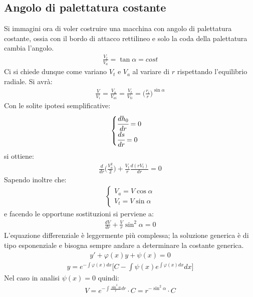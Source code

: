 \subsection{Angolo di palettatura costante}
Si immagini ora di voler costruire una macchina con angolo di palettatura costante, ossia con il bordo di attacco rettilineo e solo la coda della palettatura cambia l'angolo.
\begin{align*}
\frac{V_t}{V_a} = \tan \alpha = cost
\end{align*}
Ci si chiede dunque come variano $V_t$ e $V_a$ al variare di $r$ rispettando l'equilibrio radiale.
Si avrà:
\begin{align*}
\frac{V}{V_i} = \frac{V_a}{V_{ai}} = \frac{V_t}{V_{ti}} = \bigg(\frac{r_i}{r} \bigg)^{\sin \alpha}
\end{align*}
Con le solite ipotesi semplificative:
\begin{align*}
\begin{cases}
\cfrac{dh_0}{dr} = 0\\
\cfrac{ds}{dr} = 0 
\end{cases}
\end{align*}
si ottiene:
\begin{align*}
\frac{d}{dr} \bigg(\frac{V_a^2}{2} \bigg) + \frac{V_t}{r} \frac{d(rV_t)}{dr} = 0
\end{align*}
Sapendo inoltre che:
\begin{align*}
\begin{cases}
V_a = V \cos \alpha\\
V_t = V \sin \alpha
\end{cases}
\end{align*}
e facendo le opportune sostituzioni si perviene a:
\begin{align*}
\frac{dV}{dr} + \frac{V}{r} \sin^2 \alpha = 0
\end{align*}
L'equazione differenziale è leggermente più complessa; la soluzione generica è di tipo esponenziale e bisogna sempre andare a determinare la costante generica.
\begin{align*}
y' + \varphi(x)y + \psi(x) = 0 
\end{align*}
\begin{align*}
y = e^{-\int \varphi(x)dx} \bigg[ C- \int \psi(x) e^{\int \varphi(x)dx} dx \bigg] 
\end{align*}
Nel caso in analisi $\psi(x) = 0$ quindi:
\begin{align*}
V = e^{-\int \frac{\sin^2 \alpha}{r}dr}\cdot C = r^{-\sin^2 \alpha} \cdot C
\end{align*}
